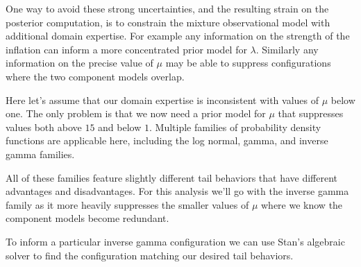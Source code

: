 \documentclass[
  letterpaper,
  DIV=11,
  numbers=noendperiod]{scrartcl}
\begin{document}
One way to avoid these strong uncertainties, and the resulting strain on
the posterior computation, is to constrain the mixture observational
model with additional domain expertise. For example any information on
the strength of the inflation can inform a more concentrated prior model
for \(\lambda\). Similarly any information on the precise value of
\(\mu\) may be able to suppress configurations where the two component
models overlap.

Here let's assume that our domain expertise is inconsistent with values
of \(\mu\) below one. The only problem is that we now need a prior model
for \(\mu\) that suppresses values both above \(15\) and below \(1\).
Multiple families of probability density functions are applicable here,
including the log normal, gamma, and inverse gamma families.

All of these families feature slightly different tail behaviors that
have different advantages and disadvantages. For this analysis we'll go
with the inverse gamma family as it more heavily suppresses the smaller
values of \(\mu\) where we know the component models become redundant.

To inform a particular inverse gamma configuration we can use Stan's
algebraic solver to find the configuration matching our desired tail
behaviors.
\end{document}
